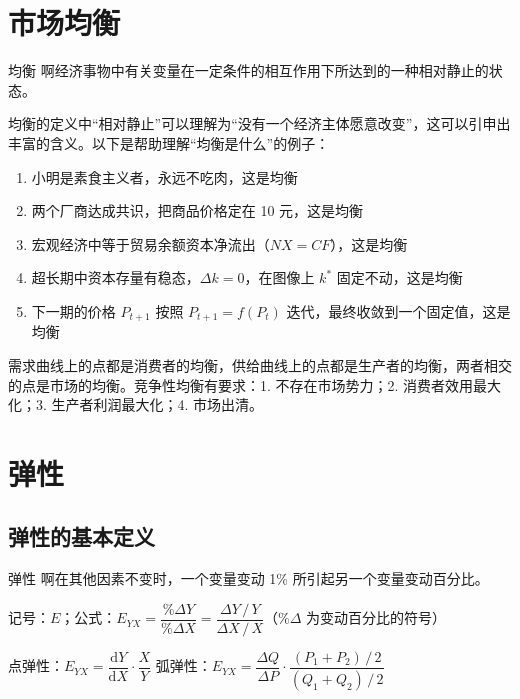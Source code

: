 \section{市场均衡}

\begin{dingyi}[breakable]{均衡}
    啊经济事物中有关变量在一定条件的相互作用下所达到的一种相对静止的状态。
\end{dingyi}

均衡的定义中“相对静止”可以理解为“没有一个经济主体愿意改变”，这可以引申出丰富的含义。以下是帮助理解“均衡是什么”的例子：

\begin{enumerate}
    \item 小明是素食主义者，永远不吃肉，这是均衡
    \item 两个厂商达成共识，把商品价格定在 10 元，这是均衡
    \item 宏观经济中等于贸易余额资本净流出（$NX=CF$），这是均衡
    \item 超长期中资本存量有稳态，$\Delta k=0$，在图像上 $k^*$ 固定不动，这是均衡
    \item 下一期的价格 $P_{t+1}$ 按照 $P_{t+1}=f\left(P_t\right)$ 迭代，最终收敛到一个固定值，这是均衡
\end{enumerate}

需求曲线上的点都是消费者的均衡，供给曲线上的点都是生产者的均衡，两者相交的点是市场的均衡。竞争性均衡有要求：1. 不存在市场势力；2. 消费者效用最大化；3. 生产者利润最大化；4. 市场出清。

\section{弹性}

\subsection{弹性的基本定义}

\begin{dingyi}[breakable]{弹性}
    啊在其他因素不变时，一个变量变动 1\% 所引起另一个变量变动百分比。
    \vspace{0.5em}
    
    记号：$E$；公式：$E_{YX}=\dfrac{\%\Delta Y}{\%\Delta X}=\dfrac{\Delta Y\,/\,Y}{\Delta X\,/\,X}$（$\%\Delta$ 为变动百分比的符号）
    \vspace{0.5em}
    
    点弹性：$E_{YX}=\dfrac{\mathrm dY}{\mathrm dX}\cdot\dfrac XY$ \quad\quad 弧弹性：$E_{YX}=\dfrac{\Delta Q}{\Delta P}\cdot\dfrac{\left(P_1+P_2\right)\,/\,2}{\left(Q_1+Q_2\right)\,/\,2}$
\end{dingyi}


